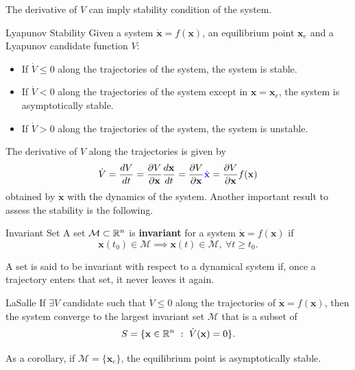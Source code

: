 \documentclass[10pt, a4paper]{report}
\begin{document}
The derivative of $V$ can imply stability condition of the system.
\begin{boxtheorem}{Lyapunov Stability}{}
    Given a system $\dot {\mathbf x}=f(\mathbf x)$, an equilibrium point $\mathbf x_e$ and a Lyapunov candidate function $V$:\begin{itemize}
        \item If $\dot V\le 0$ along the trajectories of the system, the system is stable.
        \item If $\dot V< 0$ along the trajectories of the system except in $\mathbf x=\mathbf x_e$, the system is asymptotically stable.
        \item If $\dot V> 0$ along the trajectories of the system, the system is unstable.
    \end{itemize}
\end{boxtheorem}
The derivative of $V$ along the  trajectories is given by\begin{equation}
    \dot V=\frac{dV}{dt}=\frac{\partial V}{\partial \mathbf x}\frac{d\mathbf x}{dt}=\frac{\partial V}{\partial \mathbf x}\color{blue}\dot{\mathbf x}\color{black}=\frac{\partial V}{\partial \mathbf x}f(\mathbf x)
\end{equation}
obtained by  $\dot{\mathbf x}$ with the dynamics of the system.
Another important result to assess the stability is the following.
\begin{boxdefinition}{Invariant Set}{}
    A set $\mathcal M\subset {\mathbb R}^n$ is \textbf{invariant} for a system 
    $\dot {\mathbf x}=f(\mathbf x)$ if\begin{equation}
        \mathbf x(t_0)\in \mathcal M\implies \mathbf x(t)\in \mathcal M, \ \forall t\ge t_0.
    \end{equation}
\end{boxdefinition}
A set is said to be invariant with respect to a dynamical system if, once a trajectory enters that set, it never leaves it again.
\begin{boxtheorem}{LaSalle}{}
    If $\exists V$ candidate such that $\dot V\le 0$ along the trajectories of $\dot {\mathbf x}=f(\mathbf x)$, then the system converge to the largest invariant set $\mathcal M$ that is a subset of \begin{equation}
        S=\{\mathbf x\in \R^n\ : \ \dot V(\mathbf x)=0\}.
    \end{equation}
\end{boxtheorem}
\noindent As a corollary, if $\mathcal M=\{\mathbf x_e\}$, the equilibrium point is asymptotically stable.\bigskip
\end{document}
